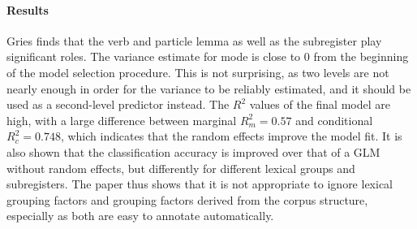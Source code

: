 \begin{svgraybox}
  \vspace{-\baselineskip}\paragraph{Results}\vspace{-0.5\baselineskip}

  Gries finds that the verb and particle lemma as well as the subregister play significant roles.
  The variance estimate for mode is close to $0$ from the beginning of the model selection procedure.
  This is not surprising, as two levels are not nearly enough in order for the variance to be reliably estimated, and it should be used as a second-level predictor instead.
  The $R^2$ values of the final model are high, with a large difference between marginal $R^2_m=0.57$ and conditional $R^2_c=0.748$, which indicates that the random effects improve the model fit.
  It is also shown that the classification accuracy is improved over that of a GLM without random effects, but differently for different lexical groups and subregisters.
  The paper thus shows that it is not appropriate to ignore lexical grouping factors and grouping factors derived from the corpus structure, especially as both are easy to annotate automatically.

\end{svgraybox}

\newpage
